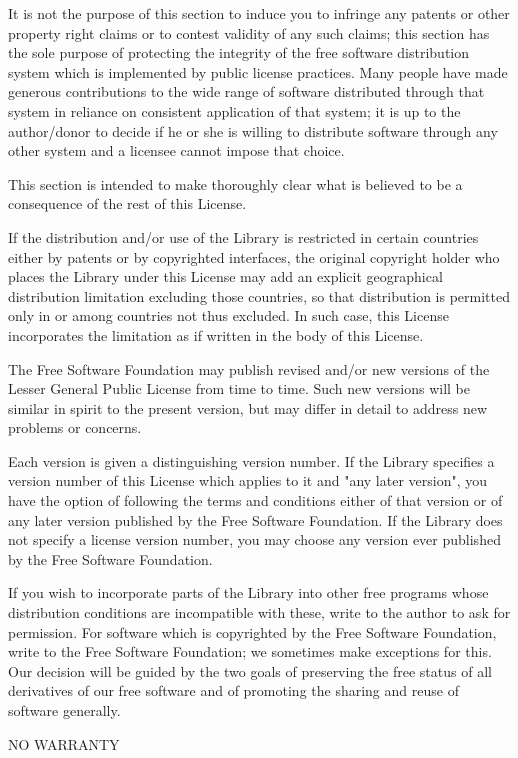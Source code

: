 It is not the purpose of this section to induce you to infringe any patents or other property right claims or to contest validity of any such claims; this section has the sole purpose of protecting the integrity of the free software distribution system which is implemented by public license practices. Many people have made generous contributions to the wide range of software distributed through that system in reliance on consistent application of that system; it is up to the author/donor to decide if he or she is willing to distribute software through any other system and a licensee cannot impose that choice.

This section is intended to make thoroughly clear what is believed to be a consequence of the rest of this License.


\begin{DoxyEnumerate}
\item If the distribution and/or use of the Library is restricted in certain countries either by patents or by copyrighted interfaces, the original copyright holder who places the Library under this License may add an explicit geographical distribution limitation excluding those countries, so that distribution is permitted only in or among countries not thus excluded. In such case, this License incorporates the limitation as if written in the body of this License.
\item The Free Software Foundation may publish revised and/or new versions of the Lesser General Public License from time to time. Such new versions will be similar in spirit to the present version, but may differ in detail to address new problems or concerns.
\end{DoxyEnumerate}

Each version is given a distinguishing version number. If the Library specifies a version number of this License which applies to it and "{}any later version"{}, you have the option of following the terms and conditions either of that version or of any later version published by the Free Software Foundation. If the Library does not specify a license version number, you may choose any version ever published by the Free Software Foundation.


\begin{DoxyEnumerate}
\item If you wish to incorporate parts of the Library into other free programs whose distribution conditions are incompatible with these, write to the author to ask for permission. For software which is copyrighted by the Free Software Foundation, write to the Free Software Foundation; we sometimes make exceptions for this. Our decision will be guided by the two goals of preserving the free status of all derivatives of our free software and of promoting the sharing and reuse of software generally. \begin{DoxyVerb}                        NO WARRANTY
\end{DoxyVerb}

\end{DoxyEnumerate}


